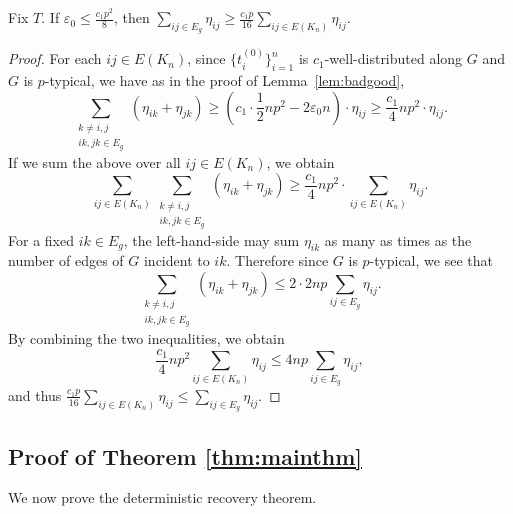 \begin{lemma} \label{lem:transference} 
Fix $T$. If $\varepsilon_0 \leq \frac{c_1 p^2}{8}$, then $\sum_{ij\in E_{g}}\eta_{ij}\ge\frac{c_{1}p}{16}\sum_{ij\in E(K_{n})}\eta_{ij}$.
\end{lemma}
\begin{proof}
For each $ij\in E(K_{n})$, since $\{t_{i}^{(0)}\}_{i=1}^{n}$ is
$c_{1}$-well-distributed along $G$ and $G$ is $p$-typical, we
have as in the proof of Lemma~\ref{lem:badgood},
\[
	\sum_{\substack{k\neq i,j\\ik,jk\in E_{g}}}(\eta_{ik}+\eta_{jk})
	\ge \left(c_{1}\cdot\frac{1}{2}np^{2}-2\varepsilon_0 n\right) \cdot\eta_{ij} 
	\ge \frac{c_{1}}{4}np^{2}\cdot\eta_{ij}.
\]
If we sum the above over all $ij\in E(K_{n})$, we obtain 
\[
	\sum_{ij\in E(K_{n})}\sum_{\substack{k\neq i,j\\ik,jk\in E_{g}}}(\eta_{ik}+\eta_{jk})
	\ge \frac{c_{1}}{4}np^{2} \cdot\sum_{ij\in E(K_{n})}\eta_{ij}.
\]
For a fixed $ik\in E_{g}$, the left-hand-side may sum $\eta_{ik}$
as many as times as the number of edges of $G$ incident to $ik$. Therefore
since $G$ is $p$-typical, we see that 
\[
	\sum_{\substack{k\neq i,j\\ik,jk\in E_{g}}}(\eta_{ik}+\eta_{jk})
	\le 2\cdot2np\sum_{ij\in E_{g}}\eta_{ij}.
\]
By combining the two inequalities, we obtain 
\[
 	\frac{c_{1}}{4}np^{2}\sum_{ij\in E(K_{n})}\eta_{ij}
 	\le 4np\sum_{ij\in E_{g}}\eta_{ij},
\]
and thus $\frac{c_{1}p}{16}\sum_{ij\in E(K_{n})}\eta_{ij}\le\sum_{ij\in E_{g}}\eta_{ij}.$
\end{proof}






\subsection{Proof of Theorem \ref{thm:mainthm}} \label{sec-proof-mainthm}


We now prove the deterministic recovery theorem.

